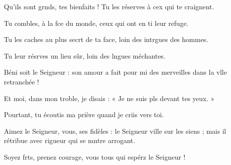 \item Qu’ils sont grnds, tes bienfaits !\psstar{} Tu les réserves à cex qui te craignent.
\item Tu combles, à la fce du monde,\psstar{} ceux qui ont en ti leur refuge.
\item Tu les caches au plus secrt de ta face,\psstar{} loin des intrgues des hommes.
\item Tu leur résrves un lieu sûr,\psstar{} loin des lngues méchantes.
\item Béni soit le Seigneur :\pscross{} son amour a fait pour mi des merveilles\psstar{} dans la vlle retranchée !
\item Et moi, dans mon troble, je disais :\psstar{} « Je ne suis pls devant tes yeux. »
\item Pourtant, tu écoutis ma prière\psstar{} quand je criis vers toi.
\item Aimez le Seigneur, vous, ses fidèles :\pscross{} le Seigneur ville sur les siens ;\psstar{} mais il rétribue avec rigueur qui se mntre arrogant.
\item Soyez frts, prenez courage,\psstar{} vous tous qui espérz le Seigneur !